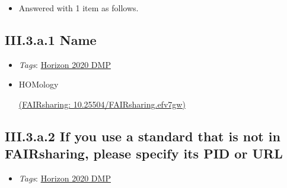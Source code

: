 \documentclass[a4paper,12pt]{report}
\begin{document}
\begin{itemize}
  \item[\ArrowBoldDownRight] Answered with 1 item as follows.
\end{itemize}%
\subsection*{\protect\textcolor{colorSecId}{III.3.a.1} Name}

\label{b1df3c74-0b1f-4574-81c4-4cc2d780c1af.2bac9020-99cf-4463-8d34-0b0eb2781cd1.8bd7b12a-7c0f-46e1-92b1-80f0fb796085.9a7e42c3-eed2-46da-bf45-52acbf1eb50f}


\begin{itemize}
  \item \textit{Tags}: \ul{Horizon 2020 DMP}
  \end{itemize}




\begin{itemize}
  \item[\CheckmarkBold]
  \begin{markdown}
  HOMology
  \end{markdown}
  \href{https://fairsharing.org/10.25504/FAIRsharing.efv7gw}{(FAIRsharing: 10.25504/FAIRsharing.efv7gw)}
  
\end{itemize}


\subsection*{\protect\textcolor{colorSecId}{III.3.a.2} If you use a standard that is not in FAIRsharing, please specify its PID or URL}

\label{b1df3c74-0b1f-4574-81c4-4cc2d780c1af.2bac9020-99cf-4463-8d34-0b0eb2781cd1.8bd7b12a-7c0f-46e1-92b1-80f0fb796085.c00627a4-40e3-48c2-b481-a0cff5e00080}


\begin{itemize}
  \item \textit{Tags}: \ul{Horizon 2020 DMP}
  \end{itemize}
\end{document}
